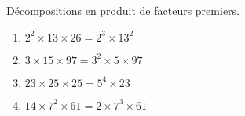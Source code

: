     Décompositions en produit de facteurs premiers.

    \begin{enumerate}
        \item $2^2\times 13\times 26=2^3\times 13^2$
        \item $3\times 15\times 97=3^2\times 5\times 97$
        \item $23\times 25\times 25=5^4\times 23$
        \item $14\times 7^2\times 61=2\times 7^3\times 61$
    \end{enumerate}
